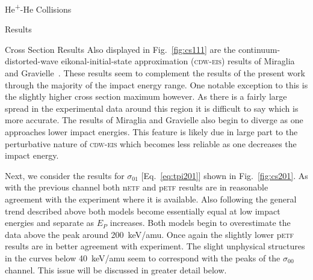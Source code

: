 \documentclass[letterpaper, 11 pt]{report}
\begin{document}
\begin{chapter}{\texorpdfstring{He\textsuperscript{+}}{He+}-He Collisions \label{chap:hephe}}
\begin{section}{Results \label{sec:hephe-disc}}
\begin{subsection}{Cross Section Results \label{sec:hephe-res}}
         Also displayed in Fig.~\ref{fig:cs111} are the continuum-distorted-wave eikonal-initial-state
         approximation (\textsc{cdw-eis}) results of Miraglia and Gravielle~\cite{MG-10}. These results
         seem to complement the results of the present work through the majority of the impact energy
         range. One notable exception to this is the slightly higher cross section maximum however. As
         there is a fairly large spread in the experimental data around this region it is difficult to
         say which is more accurate. The results of Miraglia and Gravielle also begin to diverge as one
         approaches lower impact energies. This feature is likely due in large part to the perturbative
         nature of \textsc{cdw-eis} which becomes less reliable as one decreases the impact energy.

         Next, we consider the results for $\sigma_{01}$ [Eq.~\eqref{eq:tpi201}] shown in
         Fig.~\ref{fig:cs201}. As with the previous channel both n\textsc{etf} and p\textsc{etf} results
         are in reasonable agreement with the experiment where it is available. Also following the
         general trend described above both models become essentially equal at low impact energies and
         separate as $E_P$ increases. Both models begin to overestimate the data above the peak around
         200~keV/amu. Once again the slightly lower p\textsc{etf} results are in better agreement with
         experiment. The slight unphysical structures in the curves below 40~keV/amu seem to correspond
         with the peaks of the $\sigma_{00}$ channel. This issue will be discussed in greater detail
         below.


\end{subsection}
\end{section}
\end{chapter}
\end{document}

